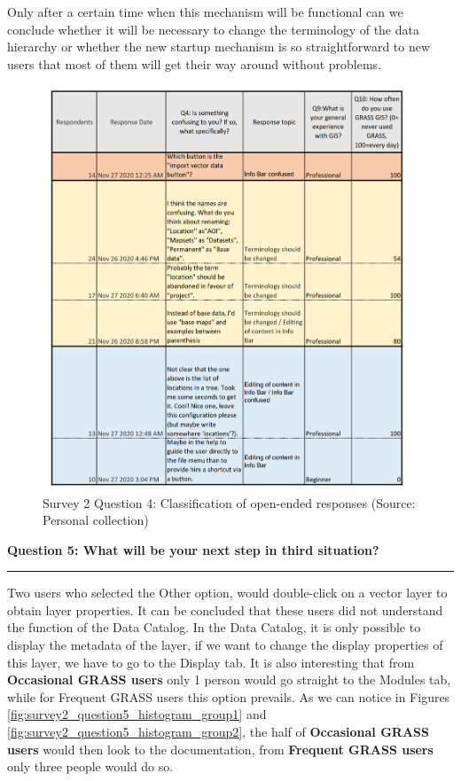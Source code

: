 \documentclass[a4paper,10pt,twoside]{article}
\begin{document}
\noindent Only after a certain time when this mechanism will be
functional can we conclude whether it will be necessary to change the
terminology of the data hierarchy or whether the new startup mechanism
is so straightforward to new users that most of them will get their
way around without problems.

\newpage
\vspace{0.3cm}
\begin{figure}[hbt!] 
\begin{center}
\includegraphics[width=16.5cm]{../surveys/analyzed_data/survey2_question4.png} 
\caption[Survey 2 Question 4: Classification of open-ended responses]{Survey 2 Question 4: Classification of open-ended responses (Source: Personal collection)}
\label{fig:survey2_question4}
\end{center}
\end{figure}

\newpage
\noindent \textbf{Question 5:  What will be your next step in third situation?}
\par\noindent\rule{\textwidth}{0.4pt}

\noindent Two users who selected the Other option, would double-click
on a vector layer to obtain layer properties. It can be concluded that
these users did not understand the function of the Data Catalog. In
the Data Catalog, it is only possible to display the metadata of the
layer, if we want to change the display properties of this layer, we
have to go to the Display tab. It is also interesting that from
\textbf{Occasional GRASS users} only 1 person would go straight to the
Modules tab, while for {Frequent GRASS users} this option prevails. As
we can notice in Figures \ref{fig:survey2_question5_histogram_group1}
and \ref{fig:survey2_question5_histogram_group2}, the half of
\textbf{Occasional GRASS users} would then look to the documentation,
from \textbf{Frequent GRASS users} only three people would do so.
\end{document}
